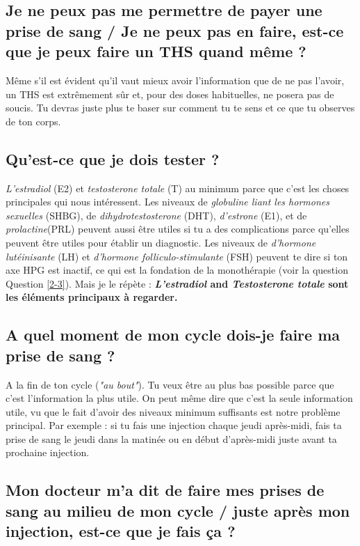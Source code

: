 \documentclass{article}
\begin{document}
\subsection{Je ne peux pas me permettre de payer une prise de sang / Je ne peux pas en faire, est-ce que je peux faire un THS quand même ?}

Même s'il est évident qu'il vaut mieux avoir l'information que de ne pas l'avoir, un THS est extrêmement sûr et, pour des doses habituelles, ne posera pas de soucis. Tu devras juste plus te baser sur comment tu te sens et ce que tu observes de ton corps.

\subsection{Qu'est-ce que je dois tester ?}

\textit{L'estradiol} (E2) et \textit{testosterone totale} (T) au minimum parce que c'est les choses principales qui nous intéressent. Les niveaux de \textit{globuline liant les hormones sexuelles} (SHBG), de \textit{dihydrotestosterone} (DHT), \textit{d'estrone} (E1), et de \textit{prolactine}(PRL) peuvent aussi être utiles si tu a des complications parce qu'elles peuvent être utiles pour établir un diagnostic. Les niveaux de \textit{d'hormone lutéinisante} (LH) et \textit{d'hormone folliculo-stimulante} (FSH) peuvent te dire si ton axe HPG est inactif, ce qui est la fondation de la monothérapie (voir la question Question \ref{2-3}). Mais je le répète : \textbf{\textit{L'estradiol} and \textit{Testosterone totale} sont les éléments principaux à regarder.}

\subsection{A quel moment de mon cycle dois-je faire ma prise de sang ?}

A la fin de ton cycle (\textit{"au bout"}). Tu veux être au plus bas possible parce que c'est l'information la plus utile. On peut même dire que c'est la seule information utile, vu que le fait d'avoir des niveaux minimum suffisants est notre problème principal. Par exemple : si tu fais une injection chaque jeudi après-midi, fais ta prise de sang le jeudi dans la matinée ou en début d'après-midi juste avant ta prochaine injection.

\subsection{Mon docteur m'a dit de faire mes prises de sang au milieu de mon cycle / juste après mon injection, est-ce que je fais ça ?}
\end{document}
